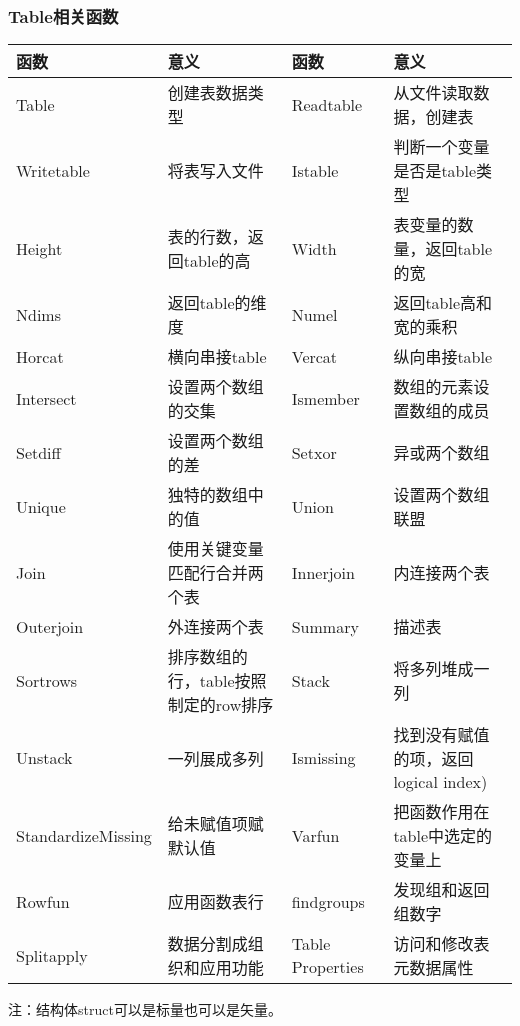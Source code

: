         \subsubsection{Table相关函数}
            \begin{table}[H]
            \centering
                \begin{tabularx}{\textwidth}{lXlX}%
                \toprule
                函数 & 意义&函数 & 意义\\
                \midrule
            Table   & 创建表数据类型&Readtable &从文件读取数据，创建表  \\
            Writetable  &将表写入文件&Istable &判断一个变量是否是table类型\\
            Height  &表的行数，返回table的高 & Width & 表变量的数量，返回table的宽\\
            Ndims   &返回table的维度&Numel  &返回table高和宽的乘积\\
            Horcat  &横向串接table&Vercat &纵向串接table\\
            Intersect &设置两个数组的交集&Ismember &数组的元素设置数组的成员\\
            Setdiff &设置两个数组的差&Setxor  &异或两个数组\\
            Unique  &独特的数组中的值&Union &设置两个数组联盟\\
            Join  &使用关键变量匹配行合并两个表&Innerjoin &内连接两个表\\
            Outerjoin &外连接两个表&Summary &描述表\\
            Sortrows  &排序数组的行，table按照制定的row排序&Stack &将多列堆成一列\\
            Unstack &一列展成多列 & Ismissing &找到没有赋值的项，返回logical index)\\
            StandardizeMissing  &给未赋值项赋默认值&Varfun &把函数作用在table中选定的变量上\\
            Rowfun  &应用函数表行& findgroups &发现组和返回组数字\\
            Splitapply  &数据分割成组织和应用功能&Table Properties  &访问和修改表元数据属性\\
                \bottomrule
            \end{tabularx}
            \end{table}
            \noindent 注：结构体struct可以是标量也可以是矢量。
